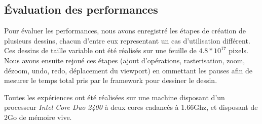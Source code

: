 		\subsection{Évaluation des performances}
			Pour évaluer les performances, nous avons enregistré les étapes de création de plusieurs dessins, chacun d'entre eux representant
			un cas d'utilisation différent. Ces dessins de taille variable ont été réalisés sur une feuille de $4.8*10^17$ pixels. Nous avons 
			ensuite rejoué ces étapes (ajout d'opérations, rasterisation, zoom, dézoom, undo, redo,
			déplacement du viewport) en ommettant les pauses afin de mesurer le temps total pris par le framework pour dessiner le dessin.
			
			Toutes les expériences ont été réalisées sur une machine disposant d'un processeur \emph{Intel Core Duo 2400} à deux cores cadancés
			à 1.66Ghz, et disposant de 2Go de mémoire vive. 

